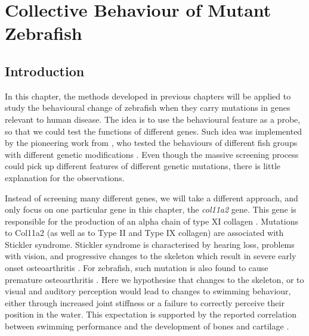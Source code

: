 \documentclass[11pt,twoside]{report}
\begin{document}
\chapter{Collective Behaviour of Mutant Zebrafish}
\label{chapter:fish_mutation}

\section{Introduction}


In this chapter, the methods developed in previous chapters will be applied to study the behavioural change of zebrafish when they carry mutations in genes relevant to human disease. The idea is to use the behavioural feature as a probe, so that we could test the functions of different genes.
Such idea was implemented by the pioneering work from \citeauthor{tang2020}, who tested the behaviours of different fish groups with different genetic modifications \cite{tang2020}. Even though the massive screening process could pick up different features of different genetic mutations, there is little explanation for the observations.

Instead of screening many different genes, we will take a different approach, and only focus on one particular gene in this chapter, the \emph{col11a2} gene. This gene is responsible for the production of an alpha chain of type XI collagen \cite{lawrence2018}.
Mutations to Col11a2 (as well as to Type II and Type IX collagen) are associated with Stickler syndrome. Stickler syndrome is characterised by hearing loss, problems with vision, and progressive changes to the skeleton which result in severe early onset osteoarthritis \cite{vikkula1995, jakkula2005}.
For zebrafish, such mutation is also found to cause premature osteoarthritis \cite{lawrence2018}.
Here we hypothesise that changes to the skeleton, or to visual and auditory perception would lead to changes to swimming behaviour, either through increased joint stiffness or a failure to correctly perceive their position in the water.
This expectation is supported by the reported correlation between swimming performance and the development of bones \cite{fontaine2008} and cartilage \cite{tseng2021}.
\end{document}
